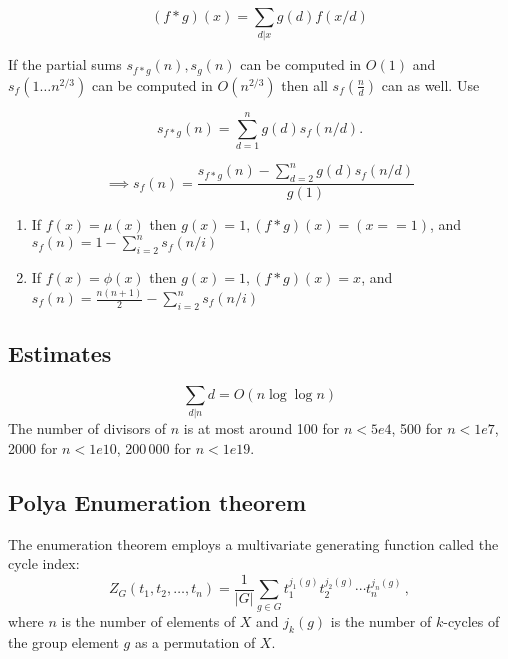 	$$(f*g)(x)=\sum_{d|x}g(d)f(x/d)$$

	If the partial sums $s_{f*g}(n),s_g(n)$ can be computed in $O(1)$ and $s_f(1\ldots n^{2/3})$  can be computed in $O\left(n^{2/3}\right)$ then all $s_f\left(\frac{n}{d}\right)$ can as well. Use

	$$s_{f*g}(n)=\sum_{d=1}^ng(d)s_f(n/d).$$ 

	 $$\implies s_f(n)=\frac{s_{f*g}(n)-\sum_{d=2}^ng(d)s_f(n/d)}{g(1)}$$
	\begin{enumerate}
	 \item If $f(x)=\mu(x)$ then $g(x)=1, (f*g)(x)=(x == 1)$, and $s_f(n)=1-\sum_{i=2}^ns_f(n/i)$\\

	 \item If $f(x)=\phi(x)$ then $g(x)=1, (f*g)(x)=x$, and $s_f(n)=\frac{n(n+1)}{2}-\sum_{i=2}^ns_f(n/i)$
  \end{enumerate}




\subsection{Estimates}
\[
	\sum_{d|n} d = O(n \log \log n)
\]
	The number of divisors of $n$ is at most around 100 for $n < 5e4$, 500 for $n < 1e7$, 2000 for $n < 1e10$, 200\,000 for $n < 1e19$.

	

\iffalse
\subsection{Polya Enumeration theorem}
The enumeration theorem employs a multivariate generating function called the cycle index:
$$Z_{G}(t_{1},t_{2},\ldots ,t_{n})={\frac {1}{|G|}}\sum _{g\in G}t_{1}^{j_{1}(g)}t_{2}^{j_{2}(g)}\cdots t_{n}^{j_{n}(g)}\,,$$
where $n$ is the number of elements of $X$ and $j_k(g)$ is the number of $k$-cycles of the group element $g$ as a permutation of $X$.

